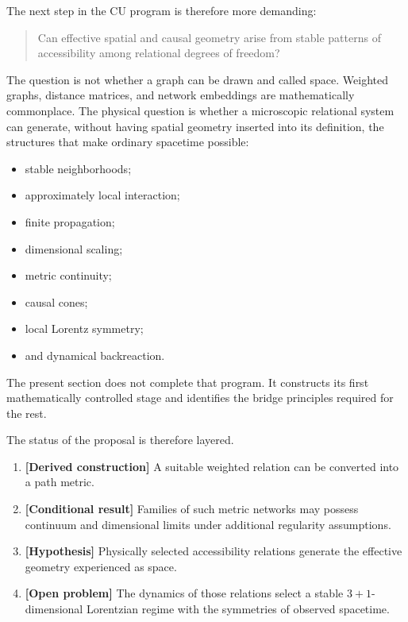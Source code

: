 \documentclass[
  11pt,
]{article}
\providecommand{\tightlist}{%
  \setlength{\itemsep}{0pt}\setlength{\parskip}{0pt}}
\begin{document}
The next step in the CU program is therefore more demanding:

\begin{quote}
Can effective spatial and causal geometry arise from stable patterns of
accessibility among relational degrees of freedom?
\end{quote}

The question is not whether a graph can be drawn and called space.
Weighted graphs, distance matrices, and network embeddings are
mathematically commonplace. The physical question is whether a
microscopic relational system can generate, without having spatial
geometry inserted into its definition, the structures that make ordinary
spacetime possible:

\begin{itemize}
\tightlist
\item
  stable neighborhoods;
\item
  approximately local interaction;
\item
  finite propagation;
\item
  dimensional scaling;
\item
  metric continuity;
\item
  causal cones;
\item
  local Lorentz symmetry;
\item
  and dynamical backreaction.
\end{itemize}

The present section does not complete that program. It constructs its
first mathematically controlled stage and identifies the bridge
principles required for the rest.

The status of the proposal is therefore layered.

\begin{enumerate}
\def\labelenumi{\arabic{enumi}.}
\tightlist
\item
  \textbf{{[}Derived construction{]}} A suitable weighted relation can
  be converted into a path metric.
\item
  \textbf{{[}Conditional result{]}} Families of such metric networks may
  possess continuum and dimensional limits under additional regularity
  assumptions.
\item
  \textbf{{[}Hypothesis{]}} Physically selected accessibility relations
  generate the effective geometry experienced as space.
\item
  \textbf{{[}Open problem{]}} The dynamics of those relations select a
  stable \(3+1\)-dimensional Lorentzian regime with the symmetries of
  observed spacetime.
\end{enumerate}
\end{document}
